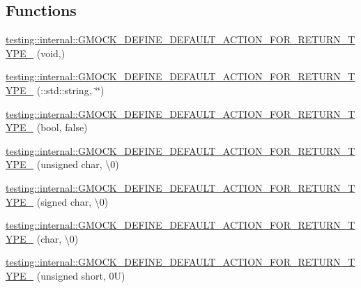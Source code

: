 \subsection*{Functions}
\begin{DoxyCompactItemize}
\item 
\mbox{\hyperlink{namespacetesting_1_1internal_a8fe6f7c11d6d3dd6e42b75c9a5b43861}{testing\+::internal\+::\+G\+M\+O\+C\+K\+\_\+\+D\+E\+F\+I\+N\+E\+\_\+\+D\+E\+F\+A\+U\+L\+T\+\_\+\+A\+C\+T\+I\+O\+N\+\_\+\+F\+O\+R\+\_\+\+R\+E\+T\+U\+R\+N\+\_\+\+T\+Y\+P\+E\+\_\+}} (void,)
\item 
\mbox{\hyperlink{namespacetesting_1_1internal_a0a961f38f341d40237252babcb3767b7}{testing\+::internal\+::\+G\+M\+O\+C\+K\+\_\+\+D\+E\+F\+I\+N\+E\+\_\+\+D\+E\+F\+A\+U\+L\+T\+\_\+\+A\+C\+T\+I\+O\+N\+\_\+\+F\+O\+R\+\_\+\+R\+E\+T\+U\+R\+N\+\_\+\+T\+Y\+P\+E\+\_\+}} (\+::std\+::string, \char`\"{}\char`\"{})
\item 
\mbox{\hyperlink{namespacetesting_1_1internal_aa6670915f42119e4ba20d8cb74fc1eea}{testing\+::internal\+::\+G\+M\+O\+C\+K\+\_\+\+D\+E\+F\+I\+N\+E\+\_\+\+D\+E\+F\+A\+U\+L\+T\+\_\+\+A\+C\+T\+I\+O\+N\+\_\+\+F\+O\+R\+\_\+\+R\+E\+T\+U\+R\+N\+\_\+\+T\+Y\+P\+E\+\_\+}} (bool, false)
\item 
\mbox{\hyperlink{namespacetesting_1_1internal_ab203e2c4c54f2ca86439344347a3e43f}{testing\+::internal\+::\+G\+M\+O\+C\+K\+\_\+\+D\+E\+F\+I\+N\+E\+\_\+\+D\+E\+F\+A\+U\+L\+T\+\_\+\+A\+C\+T\+I\+O\+N\+\_\+\+F\+O\+R\+\_\+\+R\+E\+T\+U\+R\+N\+\_\+\+T\+Y\+P\+E\+\_\+}} (unsigned char, \textquotesingle{}\textbackslash{}0\textquotesingle{})
\item 
\mbox{\hyperlink{namespacetesting_1_1internal_aaedb3b1b5307625bc84dc660742da3c6}{testing\+::internal\+::\+G\+M\+O\+C\+K\+\_\+\+D\+E\+F\+I\+N\+E\+\_\+\+D\+E\+F\+A\+U\+L\+T\+\_\+\+A\+C\+T\+I\+O\+N\+\_\+\+F\+O\+R\+\_\+\+R\+E\+T\+U\+R\+N\+\_\+\+T\+Y\+P\+E\+\_\+}} (signed char, \textquotesingle{}\textbackslash{}0\textquotesingle{})
\item 
\mbox{\hyperlink{namespacetesting_1_1internal_aeaaa7101572f283fe70a85ad5e6c65dc}{testing\+::internal\+::\+G\+M\+O\+C\+K\+\_\+\+D\+E\+F\+I\+N\+E\+\_\+\+D\+E\+F\+A\+U\+L\+T\+\_\+\+A\+C\+T\+I\+O\+N\+\_\+\+F\+O\+R\+\_\+\+R\+E\+T\+U\+R\+N\+\_\+\+T\+Y\+P\+E\+\_\+}} (char, \textquotesingle{}\textbackslash{}0\textquotesingle{})
\item 
\mbox{\hyperlink{namespacetesting_1_1internal_ab2965a6078670393812e67f8e5fcb072}{testing\+::internal\+::\+G\+M\+O\+C\+K\+\_\+\+D\+E\+F\+I\+N\+E\+\_\+\+D\+E\+F\+A\+U\+L\+T\+\_\+\+A\+C\+T\+I\+O\+N\+\_\+\+F\+O\+R\+\_\+\+R\+E\+T\+U\+R\+N\+\_\+\+T\+Y\+P\+E\+\_\+}} (unsigned short, 0\+U)

\end{DoxyCompactItemize}
